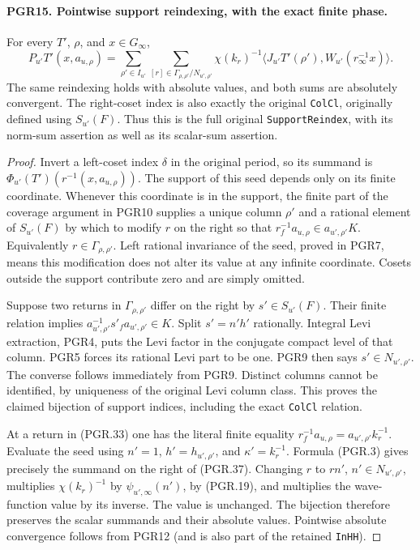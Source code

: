 \documentclass[11pt,a4paper]{article}
\numberwithin{equation}{section}
\theoremstyle{remark}\newtheorem{remark}[theorem]{Remark}
\begin{document}
\paragraph{PGR15. Pointwise support reindexing, with the exact finite phase.}
\label{claim:PGR15}
For every \(T'\), \(\rho\), and \(x\in G_\infty\),
\[
 P_{u'}T'(x,a_{u,\rho})
  =\sum_{\rho'\in I_{u'}}
       \sum_{[r]\in\Gamma_{\rho,\rho'}/N_{u',\rho'}}
         \chi(k_r)^{-1}
           \langle J_{u'}T'(\rho'),W_{u'}(r_\infty^{-1}x)\rangle.
\tag{PGR.37}
\]
The same reindexing holds with absolute values, and both sums are
absolutely convergent.  The right-coset index is also exactly the
original \texttt{Col\allowbreak Cl}, originally defined using \(S_{u'}(F)\).
Thus this is the full original \texttt{Support\allowbreak Reindex}, with its
norm-sum assertion as well as its scalar-sum assertion.
\begin{proof}
Invert a left-coset index \(\delta\) in the original period, so
its summand is \(\Phi_{u'}(T')(r^{-1}(x,a_{u,\rho}))\).
The support of this seed depends only on its finite coordinate.
Whenever this coordinate is in the support, the finite part of the
coverage argument in PGR10 supplies a unique column \(\rho'\)
and a rational element of \(S_{u'}(F)\) by which to modify \(r\)
on the right so that
\(r_f^{-1}a_{u,\rho}\in a_{u',\rho'}K\).
Equivalently \(r\in\Gamma_{\rho,\rho'}\).
Left rational invariance of the seed, proved in PGR7, means this
modification does not alter its value at any infinite coordinate.
Cosets outside the support contribute zero and are simply omitted.

Suppose two returns in \(\Gamma_{\rho,\rho'}\) differ on the
right by \(s'\in S_{u'}(F)\).  Their finite relation implies
\(a_{u',\rho'}^{-1}s'_f a_{u',\rho'}\in K\).
Split \(s'=n'h'\) rationally.  Integral Levi extraction, PGR4,
puts the Levi factor in the conjugate compact level of that column.
PGR5 forces its rational Levi part to be one.  PGR9 then says
\(s'\in N_{u',\rho'}\).  The converse follows immediately
from PGR9.  Distinct columns cannot be identified, by uniqueness of
the original Levi column class.  This proves the claimed bijection
of support indices, including the exact \texttt{Col\allowbreak Cl} relation.

At a return in (PGR.33) one has the literal finite equality
\(r_f^{-1}a_{u,\rho}=a_{u',\rho'}k_r^{-1}\).
Evaluate the seed using \(n'=1\), \(h'=h_{u',\rho'}\),
and \(\kappa'=k_r^{-1}\).  Formula (PGR.3) gives precisely
the summand on the right of (PGR.37).
Changing \(r\) to \(rn'\), \(n'\in N_{u',\rho'}\),
multiplies \(\chi(k_r)^{-1}\) by
\(\psi_{u',\infty}(n')\), by (PGR.19), and multiplies
the wave-function value by its inverse.  The value is unchanged.
The bijection therefore preserves the scalar summands and their
absolute values.  Pointwise absolute convergence follows from PGR12
(and is also part of the retained \texttt{In\allowbreak HH}).
\end{proof}
\end{document}
